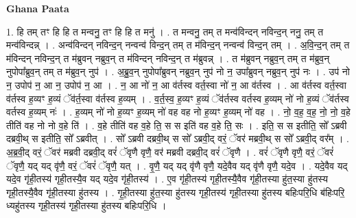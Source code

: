 \documentclass[17pt]{extarticle}
\begin{document}
\textbf{Ghana Paata } \newline

1. हि तम् तꣳ हि हि त मन्वनु॒ तꣳ हि हि त मनु॑ । . त मन्वनु॒ तम् त मन्व॑विन्दन् नविन्द॒न् ननु॒ तम् त मन्व॑विन्दन्न् । . अन्व॑विन्दन् नविन्द॒न् नन्वन्व॑ विन्द॒न् तम् त म॑विन्द॒न् नन्वन्व॑ विन्द॒न् तम् । . अ॒वि॒न्द॒न् तम् त म॑विन्दन् नविन्द॒न् त म॑ब्रुवन् नब्रुव॒न् त म॑विन्दन् नविन्द॒न् त म॑ब्रुवन्न् । . त म॑ब्रुवन् नब्रुव॒न् तम् त म॑ब्रुव॒न् नुपोपा᳚ब्रुव॒न् तम् त म॑ब्रुव॒न् नुप॑ । . अ॒ब्रु॒व॒न् नुपोपा᳚ब्रुवन् नब्रुव॒न् नुप॑ नो न॒ उपा᳚ब्रुवन् नब्रुव॒न् नुप॑ नः । . उप॑ नो न॒ उपोप॑ न॒ आ न॒ उपोप॑ न॒ आ । . न॒ आ नो॑ न॒ आ व॑र्तस्व वर्त॒स्वा नो॑ न॒ आ व॑र्तस्व । . आ व॑र्तस्व वर्त॒स्वा व॑र्तस्व ह॒व्यꣳ ह॒व्यं ॅव॑र्त॒स्वा व॑र्तस्व ह॒व्यम् । . व॒र्त॒स्व॒ ह॒व्यꣳ ह॒व्यं ॅव॑र्तस्व वर्तस्व ह॒व्यम् नो॑ नो ह॒व्यं ॅव॑र्तस्व वर्तस्व ह॒व्यम् नः॑ । . ह॒व्यम् नो॑ नो ह॒व्यꣳ ह॒व्यम् नो॑ वह वह नो ह॒व्यꣳ ह॒व्यम् नो॑ वह । . नो॒ व॒ह॒ व॒ह॒ नो॒ नो॒ व॒हे तीति॑ वह नो नो व॒हे ति॑ । . व॒हे तीति॑ वह व॒हे ति॒ स स इति॑ वह व॒हे ति॒ सः । . इति॒ स स इतीति॒ सो᳚ ऽब्रवी दब्रवी॒थ् स इतीति॒ सो᳚ ऽब्रवीत् । . सो᳚ ऽब्रवी दब्रवी॒थ् स सो᳚ ऽब्रवी॒द् वरं॒ ॅवर॑ मब्रवी॒थ् स सो᳚ ऽब्रवी॒द् वर᳚म् । . अ॒ब्र॒वी॒द् वरं॒ ॅवर॑ मब्रवी दब्रवी॒द् वरं॑ ॅवृणै वृणै॒ वर॑ मब्रवी दब्रवी॒द् वरं॑ ॅवृणै । . वरं॑ ॅवृणै वृणै॒ वरं॒ ॅवरं॑ ॅवृणै॒ यद् यद् वृ॑णै॒ वरं॒ ॅवरं॑ ॅवृणै॒ यत् । . वृ॒णै॒ यद् यद् वृ॑णै वृणै॒ यदे॒वैव यद् वृ॑णै वृणै॒ यदे॒व । . यदे॒वैव यद् यदे॒व गृ॑ही॒तस्य॑ गृही॒तस्यै॒व यद् यदे॒व गृ॑ही॒तस्य॑ । . ए॒व गृ॑ही॒तस्य॑ गृही॒तस्यै॒वैव गृ॑ही॒तस्या हु॑त॒स्या हु॑तस्य गृही॒तस्यै॒वैव गृ॑ही॒तस्या हु॑तस्य । . गृ॒ही॒तस्या हु॑त॒स्या हु॑तस्य गृही॒तस्य॑ गृही॒तस्या हु॑तस्य बहिःपरि॒धि ब॑हिःपरि॒ ध्यहु॑तस्य गृही॒तस्य॑ गृही॒तस्या हु॑तस्य बहिःपरि॒धि । \newline
\end{document}
